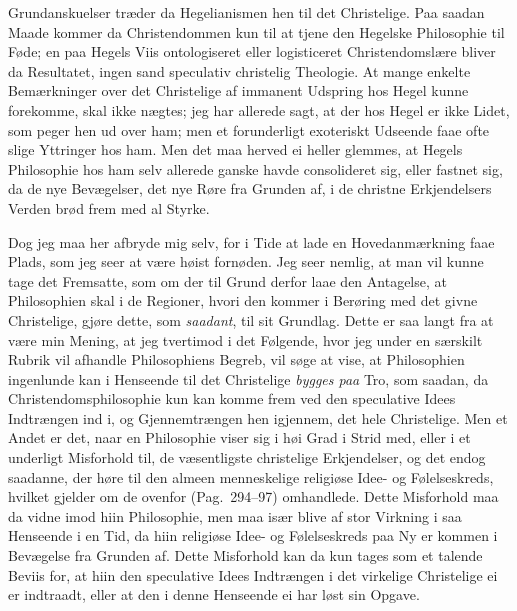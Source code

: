 \documentclass[12pt,a4paper]{book}
\newcommand{\apage}[1]{\marginnote{\footnotesize\textit{[#1]}}}
\begin{document}
Grundanskuelser træder da Hegelianismen hen til det Christelige. Paa saadan
Maade kommer da Christendommen kun til at tjene den Hegelske Philosophie til
Føde; en paa Hegels Viis ontologiseret eller logisticeret Christendomslære
bliver da Resultatet, ingen sand speculativ christelig Theologie. At mange
enkelte Bemærkninger over det Christelige af immanent Udspring hos Hegel
kunne forekomme, skal ikke nægtes; jeg har allerede sagt, at der hos Hegel
er ikke Lidet, som peger hen ud over ham; men et forunderligt exoteriskt
Udseende faae ofte slige Yttringer hos ham. Men det maa herved ei heller
glemmes, at Hegels Philosophie hos ham selv allerede ganske havde
consolideret sig, eller fastnet sig, da de nye Bevægelser, det nye Røre fra
Grunden af, i de christne Erkjendelsers Verden brød frem med al Styrke.

Dog jeg maa her afbryde mig selv, for i Tide at lade en Hovedanmærkning faae
Plads, som jeg seer at være høist fornøden. Jeg seer nemlig, at man vil
kunne tage det Fremsatte, som om der til Grund derfor laae den Antagelse, at
Philosophien skal i de Regioner, hvori den kommer i Berøring med det givne
Christelige, gjøre dette, som \emph{saadant}, til sit Grundlag. Dette er saa langt
fra at være min Mening, at jeg tvertimod i det Følgende, hvor jeg under en
særskilt Rubrik vil afhandle Philosophiens Begreb, vil søge at vise, at
Philosophien ingenlunde kan i Henseende til det Christelige \emph{bygges paa} Tro,
som saadan, da Christendomsphilosophie kun kan komme frem ved den
speculative Idees Indtrængen ind i, og Gjennemtrængen hen igjennem, det hele
Christelige. Men et Andet er det, naar en Philosophie viser sig i høi Grad i
Strid med, eller i et underligt Misforhold til, de væsentligste christelige
Erkjendelser, og det endog saadanne, der høre til den almeen menneskelige
religiøse Idee- og Følelseskreds, hvilket gjelder om de ovenfor
(Pag.\ 294--97) omhandlede. Dette \apage{21} Misforhold maa da vidne imod hiin
Philosophie, men maa især blive af stor Virkning i saa Henseende i en Tid,
da hiin religiøse Idee- og Følelseskreds paa Ny er kommen i Bevægelse fra
Grunden af. Dette Misforhold kan da kun tages som et talende Beviis for, at
hiin den speculative Idees Indtrængen i det virkelige Christelige ei er
indtraadt, eller at den i denne Henseende ei har løst sin Opgave.
\end{document}
